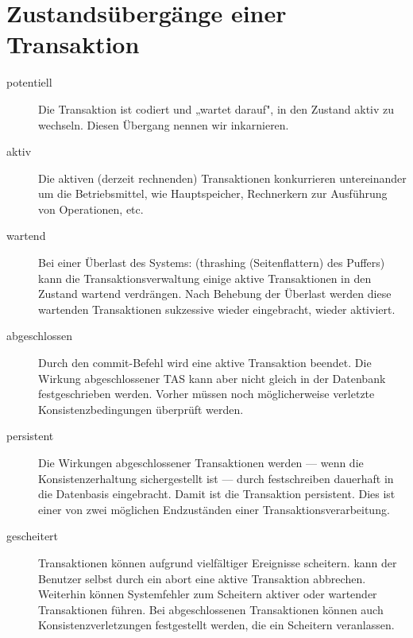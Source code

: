 \documentclass{lehramt-informatik-haupt}
\begin{document}
\section{Zustandsübergänge einer Transaktion}

\begin{liQuellen}
\item \cite[Kapitel 9.7, Seite 307]{kemper}
\item \cite[Seite 5]{db:fs:5}
\end{liQuellen}

\begin{description}
\item[potentiell]

Die Transaktion ist codiert und „wartet darauf", in den Zustand aktiv zu
wechseln. Diesen Übergang nennen wir inkarnieren.

\item[aktiv]

Die aktiven (\dh derzeit rechnenden) Transaktionen konkurrieren
untereinander um die Betriebsmittel, wie \zB Hauptspeicher, Rechnerkern
zur Ausführung von Operationen, etc.

\item[wartend]

Bei einer Überlast des Systems: (\zB thrashing (Seitenflattern) des
Puffers) kann die Transaktionsverwaltung einige aktive Transaktionen in
den Zustand wartend verdrängen. Nach Behebung der Überlast werden diese
wartenden Transaktionen sukzessive wieder eingebracht, \dh wieder
aktiviert.

\item[abgeschlossen]

Durch den commit-Befehl wird eine aktive Transaktion beendet. Die
Wirkung abgeschlossener TAS kann aber nicht gleich in der Datenbank
festgeschrieben werden. Vorher müssen noch möglicherweise verletzte
Konsistenzbedingungen überprüft werden.

\item[persistent]

Die Wirkungen abgeschlossener Transaktionen werden — wenn die
Konsistenzerhaltung sichergestellt ist — durch festschreiben dauerhaft
in die Datenbasis eingebracht. Damit ist die Transaktion persistent.
Dies ist einer von zwei möglichen Endzuständen einer
Transaktionsverarbeitung.

\item[gescheitert]

Transaktionen können aufgrund vielfältiger Ereignisse scheitern. \ZB
kann der Benutzer selbst durch ein abort eine aktive Transaktion
abbrechen. Weiterhin können Systemfehler zum Scheitern aktiver oder
wartender Transaktionen führen. Bei abgeschlossenen Transaktionen können
auch Konsistenzverletzungen festgestellt werden, die ein Scheitern
veranlassen.


\end{description}
\end{document}

